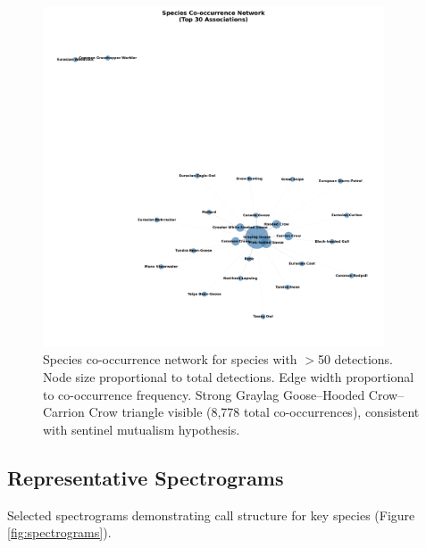\documentclass[twocolumn]{article}
\begin{document}
\begin{figure}[H]
\centering
\includegraphics[width=0.9\textwidth]{figures/cooccurrence_network.png}
\caption{Species co-occurrence network for species with $>$50 detections. Node size proportional to total detections. Edge width proportional to co-occurrence frequency. Strong Graylag Goose--Hooded Crow--Carrion Crow triangle visible (8,778 total co-occurrences), consistent with sentinel mutualism hypothesis.}
\label{fig:cooccurrence}
\end{figure}

\subsection{Representative Spectrograms}

Selected spectrograms demonstrating call structure for key species (Figure \ref{fig:spectrograms}).
\end{document}

